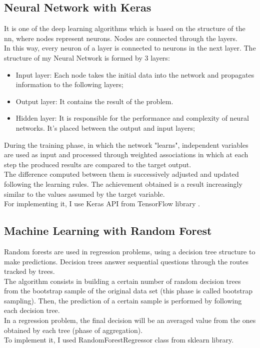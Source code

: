 \subsection{Neural Network with Keras}
It is one of the deep learning algorithms which is based on the structure of the \gls{nn}, where nodes represent neurons.
Nodes are connected through the layers. \\
In this way, every neuron of a layer is connected to neurons in the next layer.
The structure of my Neural Network is formed by 3 layers:
\begin{itemize}
    \item Input layer: Each node takes the initial data into the network and propagates information to the following layers;
    \item Output layer: It contains the result of the problem. 
    \item Hidden layer: It is responsible for the performance and complexity of neural networks. It's placed between the output and input layers;
\end{itemize}
During the training phase, in which the network "learns", independent variables are used as input and processed through weighted associations in which at each step the produced results are compared to the target output.\\ The difference computed between them is successively adjusted and updated following the learning rules. The achievement obtained is a result increasingly similar to the values assumed by the target variable.\\ 
For implementing it, I use Keras API from TensorFlow library \cite{tensorflow}.


\subsection{Machine Learning with Random Forest}
Random forests are used in regression problems, using a decision tree structure to make predictions. Decision trees answer sequential questions through the routes tracked by trees.\\
The algorithm consists in building a certain number of random decision trees from the bootstrap sample of the original data set (this phase is called bootstrap sampling). Then, the prediction of a certain sample is performed by following each decision tree. \\In a regression problem, the final decision will be an averaged value from the ones obtained by each tree (phase of aggregation).\\
To implement it, I used RandomForestRegressor class from sklearn library. 



